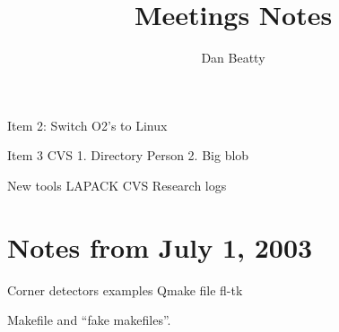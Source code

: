 \documentclass[11pt]{article}
\title{Meetings Notes}
\author{Dan Beatty}
\begin{document}
\maketitle

Item 2:
	Switch O2's to Linux
	
Item 3 
	CVS 
		1. Directory Person
		2. Big blob
		
New tools
	LAPACK
	CVS 
	Research logs
	
\section {Notes from July 1, 2003}	
Corner detectors examples
Qmake file
fl-tk 

Makefile and ``fake makefiles''.  



 
\end{document}
